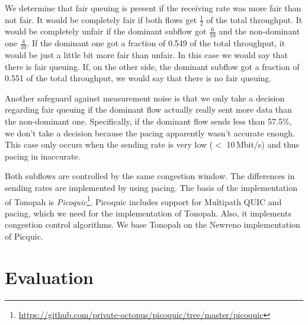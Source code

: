 \documentclass[conference]{IEEEtran}
\begin{document}
We determine that fair queuing is present if the receiving rate was more fair than not fair. 
It would be completely fair if both flows get $\frac{1}{2}$ of the total throughput. It would be completely unfair if the dominant subflow got $\frac{6}{10}$ and the non-dominant one $\frac{4}{10}$. 
If the dominant one got a fraction of 0.549 of the total throughput, it would be just a little bit more fair than unfair. In this case we would say that there is fair queuing. 
If, on the other side, the dominant subflow got a fraction of 0.551 of the total throughput, we would say that there is no fair queuing. 

Another safeguard against measurement noise is that we only take a decision regarding fair queuing if the dominant flow actually really sent more data than the non-dominant one. 
Specifically, if the dominant flow sends less than 57.5\%, we don't take a decision because the pacing apparently wasn't accurate enough. 
This case only occurs when the sending rate is very low ($<$ 10\,Mbit/s) and thus pacing in inaccurate. 

Both subflows are controlled by the same congestion window. The differences in sending rates are implemented by using pacing. 
The basis of the implementation of Tonopah is \textit{Picoquic}\footnote{\url{https://github.com/private-octopus/picoquic/tree/master/picoquic}}. 
Picoquic includes support for Multipath QUIC and pacing, which we need for the implementation of Tonopah. Also, it implements congestion control algorithms. 
We base Tonopah on the Newreno implementation of Picquic. 

\section{Evaluation}
\end{document}
